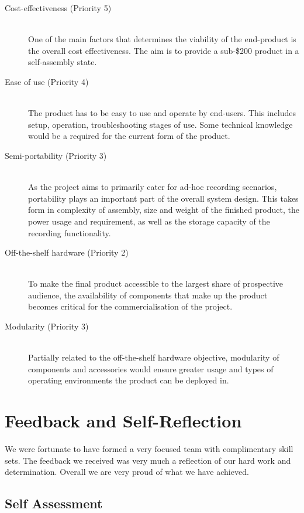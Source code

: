 \documentclass[11pt,a4paper,titlepage]{report}
\begin{document}
\begin{description}

  \item[Cost-effectiveness (Priority 5)] \hfill \\
      One of the main factors that determines the viability of the end-product is the overall cost effectiveness. The aim is to provide a sub-\$200 product in a self-assembly state.
  \item[Ease of use (Priority 4)] \hfill \\
      The product has to be easy to use and operate by end-users. This includes setup, operation, troubleshooting stages of use. Some technical knowledge would be a required for the current form of the product.
  \item[Semi-portability (Priority 3)] \hfill \\
      As the project aims to primarily cater for ad-hoc recording scenarios, portability plays an important part of the overall system design. This takes form in complexity of assembly, size and weight of the finished product, the power usage and requirement, as well as the storage capacity of the recording functionality.
  \item[Off-the-shelf hardware (Priority 2)] \hfill \\
      To make the final product accessible to the largest share of prospective audience, the availability of components that make up the product becomes critical for the commercialisation of the project.
  \item[Modularity (Priority 3)] \hfill \\
      Partially related to the off-the-shelf hardware objective, modularity of components and accessories would ensure greater usage and types of operating environments the product can be deployed in.

\end{description}



\section{Feedback and Self-Reflection}

We were fortunate to have formed a very focused team with complimentary skill sets. The feedback we received was very much a reflection of our hard work and determination. Overall we are very proud of what we have achieved.


\subsection{Self Assessment}
\end{document}
